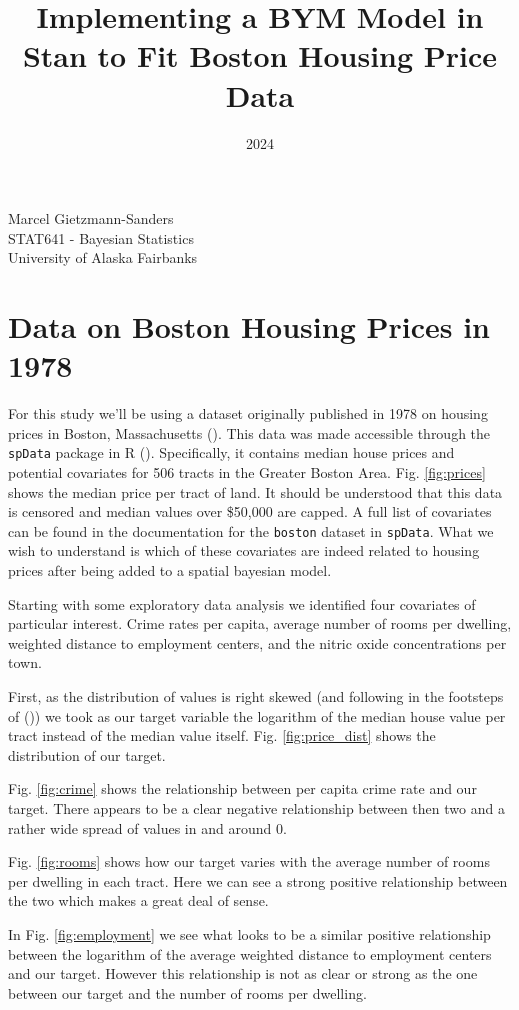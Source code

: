 \documentclass[11pt]{article}
\title{Implementing a BYM Model in Stan to Fit Boston Housing Price Data}
\date{2024}
\makeatletter
\newcommand{\code}[1]{\colorbox{light-gray}{\texttt{#1}}}
\renewcommand{\maketitle}{
\begin{center}

\pagestyle{empty}

{\Large \bf \@title\par}
\vspace{1cm}

{\LARGE Marcel Gietzmann-Sanders}\\[1cm]

STAT641 - Bayesian Statistics \\
University of Alaska Fairbanks


\end{center}
}\makeatother
\makeatother
\begin{document}
\maketitle
\tableofcontents
\newpage 

\section{Data on Boston Housing Prices in 1978}

For this study we'll be using a dataset originally published in 1978 on housing prices in Boston, Massachusetts (\cite{origin}). This data was made accessible through the \code{spData} package in R (\cite{spdata}). Specifically, it contains median house prices and potential covariates for 506 tracts in the Greater Boston Area. Fig. \ref{fig:prices} shows the median price per tract of land. It should be understood that this data is censored and median values over \$50,000 are capped. A full list of covariates can be found in the documentation for the \code{boston} dataset in \code{spData}. What we wish to understand is which of these covariates are indeed related to housing prices after being added to a spatial bayesian model. \newline

Starting with some exploratory data analysis we identified four covariates of particular interest. Crime rates per capita, average number of rooms per dwelling, weighted distance to employment centers, and the nitric oxide concentrations per town. 

First, as the distribution of values is right skewed (and following in the footsteps of (\cite{book})) we took as our target variable the logarithm of the median house value per tract instead of the median value itself. Fig. \ref{fig:price_dist} shows the distribution of our target. 



Fig. \ref{fig:crime} shows the relationship between per capita crime rate and our target. There appears to be a clear negative relationship between then two and a rather wide spread of values in and around 0. 

Fig. \ref{fig:rooms} shows how our target varies with the average number of rooms per dwelling in each tract. Here we can see a strong positive relationship between the two which makes a great deal of sense. 

In Fig. \ref{fig:employment} we see what looks to be a similar positive relationship between the logarithm of the average weighted distance to employment centers and our target. However this relationship is not as clear or strong as the one between our target and the number of rooms per dwelling. 
\end{document}
